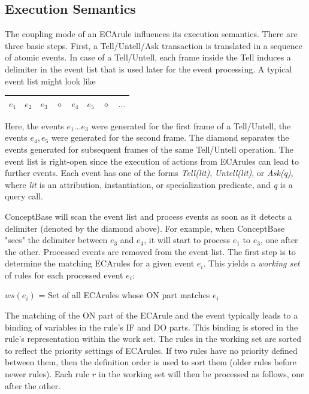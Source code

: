 \subsection{Execution Semantics}

The coupling mode of an ECArule influences its execution semantics. There are three
basic steps. First, a Tell/Untell/Ask transaction is translated in a sequence of
atomic events. In case of a Tell/Untell, each frame inside the Tell induces
a delimiter in the event list that is used later for the event processing.
A typical event list might look like


\begin{tabular}{| c | c | c | c | c | c | c | c }
  \hline			
  $e_1$ & $e_2$ & $e_3$ & $\diamond$ & $e_4$ & $e_5$ & $\diamond$ & $\ldots$\\
  \hline  
\end{tabular}


Here, the events $e_1 \ldots e_3$ were generated for the first frame of a Tell/Untell,
the events $e_4, e_5$ were generated for the second frame. The diamond separates the events
generated for subsequent frames of the same Tell/Untell operation.
The event list is right-open
since the execution of actions from ECArules can lead to further events. Each event has one
of the forms {\it Tell(lit)}, {\it Untell(lit)}, or {\it Ask(q)}, where {\it lit\/} is 
an attribution, instantiation, or specialization predicate, and {\it q\/} is a
query call. 

ConceptBase will scan the event list and process events as soon as it detects a delimiter
(denoted by the diamond above).
For example, when ConceptBase "sees" the delimiter between $e_3$ and $e_4$, it will start
to process $e_1$ to $e_3$, one after the other.
Processed events are removed from the event list. The first step is to determine the
matching ECArules for a given event $e_i$. This yields a {\it working set\/} of rules for each
processed event $e_i$:

$ws(e_i)$ = Set of all ECArules whose ON part matches $e_i$

The matching of the ON part of the ECArule and the event typically leads to a binding of 
variables in the rule's IF and DO parts. This binding is stored in the rule's representation
within the work set. The rules in the working set are sorted to reflect the priority
settings of ECArules. If two rules have no priority defined between them, then
the definition order is used to sort them (older rules before newer rules).
Each rule $r$ in the working set will then be processed as follows, one after the other.

